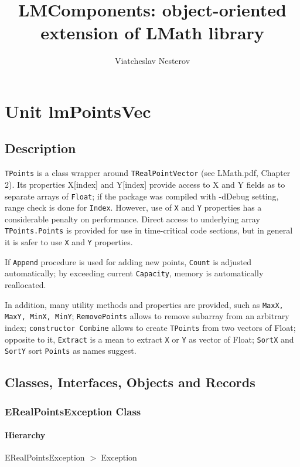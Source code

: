 \documentclass[12pt,a4paper,oneside]{report}
\newcommand{\code}[1]{\texttt{#1}}
\begin{document}
\title{LMComponents: object-oriented extension of LMath library}
\author{Viatcheslav Nesterov}
\maketitle
\newpage
\label{toc}\tableofcontents
\newpage
\newlength{\tmplength}
\chapter{Unit lmPointsVec}
\label{lmPointsVec}
\section{Description}
\code{TPoints} is a class wrapper around \code{TRealPointVector} (see LMath.pdf, Chapter 2). Its properties X[index] and Y[index] provide access to X and Y fields as to separate arrays of \code{Float}; if the package was compiled with -dDebug setting, range check is done for \code{Index}. However, use of \code{X} and \code{Y} properties has a considerable penalty on performance. Direct access to underlying array \code{TPoints.Points} is provided for use in time-critical code sections, but in general it is safer to use \code{X} and \code{Y} properties.

If \code{Append} procedure is used for adding new points, \code{Count} is adjusted automatically; by exceeding current \code{Capacity}, memory is automatically reallocated.

In addition, many utility methods and properties are provided, such as \code{MaxX, MaxY, MinX, MinY}; \code{RemovePoints} allows to remove subarray from an arbitrary index; \code{constructor Combine} allows to create \code{TPoints} from two vectors of Float; opposite to it, \code{Extract} is a mean to extract \code{X} or \code{Y} as vector of Float; \code{SortX} and \code{SortY} sort \code{Points} as names suggest.
\section{Classes, Interfaces, Objects and Records}
\subsection{ERealPointsException Class}
\label{lmPointsVec.ERealPointsException}
\subsubsection{Hierarchy}
ERealPointsException {$>$} Exception
\end{document}
